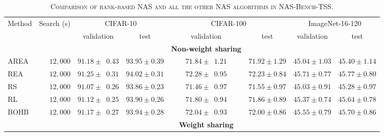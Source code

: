\documentclass[sigconf]{acmart}
\begin{document}
    \begin{table*}[htb]
        \newcommand{\z}{\phantom{0}}
        \caption{\textsc{Comparison of rank-based NAS and all the other NAS algorithms in NAS-Bench-TSS.}}
          \vspace{-\baselineskip}
        \begin{tabular}{@{}lrcccccc@{}}\toprule
        Method & Search (s) & \multicolumn{2}{c}{CIFAR-10} & \multicolumn{2}{c}{CIFAR-100} & \multicolumn{2}{c}{ImageNet-16-120} \\ \cmidrule(lr){3-4}\cmidrule(lr){5-6}\cmidrule(lr){7-8}
                             &          & validation           & test             & validation           & test             & validation       & test \\ \midrule
                             &          &                      &                  & \textbf{Non-weight sharing} &           &                  &                  \\
        AREA                 & $12,000$ & $91.18 \pm \z{0.43}$ & $93.95 \pm 0.39$ & $71.84 \pm \z{1.21}$ & $71.92 \pm 1.29$ & $45.04 \pm 1.03$ & $45.40 \pm 1.14$ \\
        REA                  & $12,000$ & $91.25 \pm \z{0.31}$ & $94.02 \pm 0.31$ & $72.28 \pm \z{0.95}$ & $72.23 \pm 0.84$ & $45.71 \pm 0.77$ & $45.77 \pm 0.80$ \\
        RS                   & $12,000$ & $91.07 \pm \z{0.26}$ & $93.86 \pm 0.23$ & $71.46 \pm \z{0.97}$ & $71.55 \pm 0.97$ & $45.03 \pm 0.91$ & $45.28 \pm 0.97$ \\
        RL                   & $12,000$ & $91.12 \pm \z{0.25}$ & $93.90 \pm 0.26$ & $71.80 \pm \z{0.94}$ & $71.86 \pm 0.89$ & $45.37 \pm 0.74$ & $45.64 \pm 0.78$ \\
        BOHB                 & $12,000$ & $91.17 \pm \z{0.27}$ & $93.94 \pm 0.28$ & $72.04 \pm \z{0.93}$ & $72.00 \pm 0.86$ & $45.55 \pm 0.79$ & $45.70 \pm 0.86$ \\ \midrule
                             &          &                      &                  & \textbf{Weight sharing} &               &                  &                  \\

\end{tabular}
\end{table*}
\end{document}
